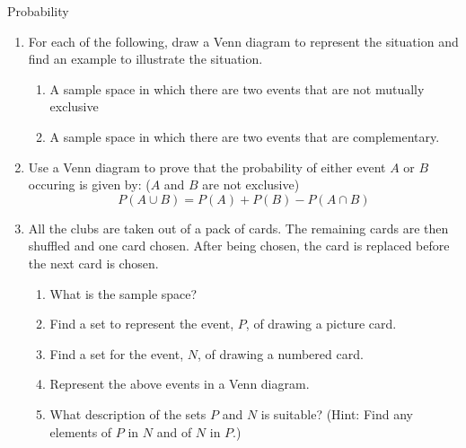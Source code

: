 \begin{eocexercises}{Probability}
\begin{enumerate}[itemsep=5pt, label=\textbf{\arabic*}. ]
    and the probability that it will be black is $\frac{3}{5}$.
    \begin{enumerate}
    \item If I choose a sweet at random what
      is the probability that it will be:
      \begin{enumerate}
      \item purple or blue
      \item Black
      \item purple
      \end{enumerate}
    \item If there are $70$ sweets in the jar how many purple ones are
      there?
    \item $\frac{1}{4}$ if the purple sweets in b) have streaks on
      them and rest do not. How many purple sweets have streaks?
    \end{enumerate}
  \item For each of the following, draw a Venn diagram to represent
    the situation and find an example to illustrate the situation.
    \begin{enumerate}
    \item A sample space in which there are two events that are not
      mutually exclusive
    \item A sample space in which there are two events that are
      complementary.
    \end{enumerate}
  \item Use a Venn diagram to prove that the probability of either
    event $A$ or $B$ occuring is given by: ($A$ and $B$ are not
    exclusive)
    \[P(A \cup B) = P(A) + P(B) - P(A \cap B)\]
  \item All the clubs are taken out of a pack of cards. The remaining
    cards are then shuffled and one card chosen. After being chosen,
    the card is replaced before the next card is chosen.
    \begin{enumerate}
    \item What is the sample space?
    \item Find a set to represent the event, $P$, of drawing a picture
      card.
    \item Find a set for the event, $N$, of drawing a numbered card.
    \item Represent the above events in a Venn diagram.
    \item What description of the sets $P$ and $N$ is suitable?
      (Hint: Find any elements of $P$ in $N$ and of $N$ in $P$.)
    \end{enumerate}

\end{enumerate}
\end{eocexercises}
